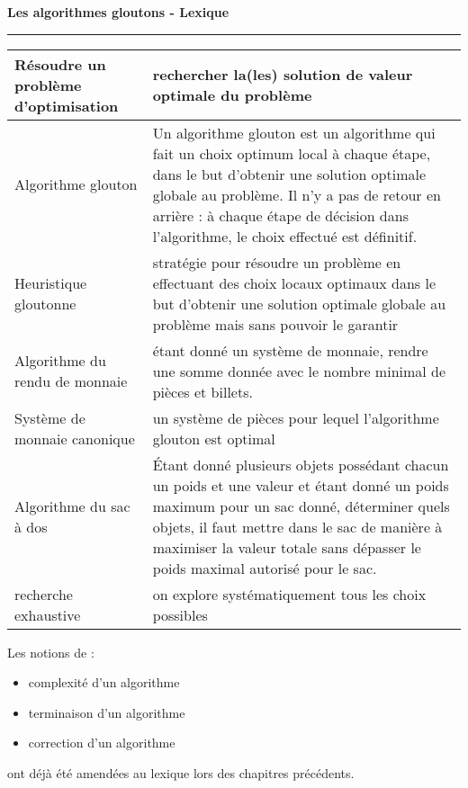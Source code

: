 \documentclass[12pt,french]{article}
\newcounter{sf}
\begin{document}
    \chead{}
      \renewcommand{\headrulewidth}{0.5pt}
      \lfoot{                      }
    \pagestyle{fancy}
    \renewcommand{\footrulewidth}{0.4pt}
\begin{center}
\textbf{\Large{Les algorithmes gloutons - Lexique }}\end{center}
\hrule


\begin{center}
\begin{tabular}{|p{4cm}|p{15.5cm}|}
\hline
Résoudre un problème d'optimisation&rechercher la(les) solution de valeur optimale du problème\\
\hline
Algorithme glouton&Un algorithme glouton est un algorithme qui fait un choix optimum local à chaque étape, dans le but d'obtenir une solution optimale globale au problème. Il n'y a pas de
retour en arrière : à chaque étape de décision dans l'algorithme, le choix effectué est définitif.\\
\hline
Heuristique gloutonne&stratégie pour résoudre un problème en effectuant des choix locaux optimaux dans le but d'obtenir une solution optimale globale au problème mais sans pouvoir le garantir\\
\hline
Algorithme du rendu de monnaie&étant donné un système de monnaie, rendre une somme donnée avec le nombre minimal de
pièces et billets.\\
\hline
Système de monnaie canonique&un système de pièces pour lequel l'algorithme glouton est optimal\\
\hline
Algorithme du sac à dos&Étant  donné  plusieurs  objets  possédant chacun  un  poids  et  une  valeur  et  étant  donné  un  poids  maximum  pour  un  sac donné,  déterminer quels  objets, il faut  mettre  dans  le  sac  de  manière  à  maximiser  la  valeur  totale  sans  dépasser  le  poids maximal autorisé pour le sac.\\
\hline
recherche exhaustive & on explore systématiquement tous les choix
possibles\\
\hline
\end{tabular}
\end{center}
Les notions de :
\begin{itemize}
	\item  complexité d'un algorithme
	\item terminaison d'un algorithme
	\item correction d'un algorithme
\end{itemize}
ont déjà été amendées au lexique lors des chapitres précédents.
\end{document}
